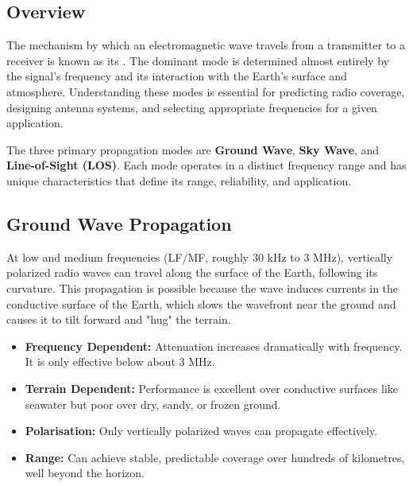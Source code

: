 \subsection{Overview}

The mechanism by which an electromagnetic wave travels from a transmitter to a receiver is known as its . The dominant mode is determined almost entirely by the signal's frequency and its interaction with the Earth's surface and atmosphere. Understanding these modes is essential for predicting radio coverage, designing antenna systems, and selecting appropriate frequencies for a given application.

\begin{keyconcept}
    The three primary propagation modes are \textbf{Ground Wave}, \textbf{Sky Wave}, and \textbf{Line-of-Sight (LOS)}. Each mode operates in a distinct frequency range and has unique characteristics that define its range, reliability, and application.
\end{keyconcept}


\subsection{Ground Wave Propagation}

At low and medium frequencies (LF/MF, roughly 30 kHz to 3 MHz), vertically polarized radio waves can travel along the surface of the Earth, following its curvature. This  propagation is possible because the wave induces currents in the conductive surface of the Earth, which slows the wavefront near the ground and causes it to tilt forward and "hug" the terrain.

\begin{itemize}
    \item \textbf{Frequency Dependent:} Attenuation increases dramatically with frequency. It is only effective below about 3 MHz.
    \item \textbf{Terrain Dependent:} Performance is excellent over conductive surfaces like seawater but poor over dry, sandy, or frozen ground.
    \item \textbf{Polarisation:} Only vertically polarized waves can propagate effectively.
    \item \textbf{Range:} Can achieve stable, predictable coverage over hundreds of kilometres, well beyond the horizon.
\end{itemize}

